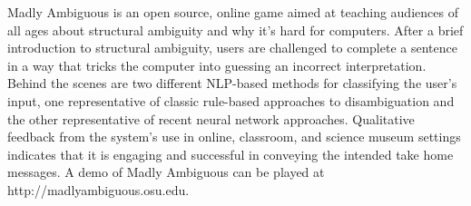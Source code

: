 Madly Ambiguous is an open source, online game aimed at teaching audiences of all ages about structural ambiguity and why it's hard for computers.  After a brief introduction to structural ambiguity, users are challenged to complete a sentence in a way that tricks the computer into guessing an incorrect interpretation.  Behind the scenes are two different NLP-based methods for classifying the user's input, one representative of classic rule-based approaches to disambiguation and the other representative of recent neural network approaches.  Qualitative feedback from the system's use in online, classroom, and science museum settings indicates that it is engaging and successful in conveying the intended take home messages. A demo of Madly Ambiguous can be played at http://madlyambiguous.osu.edu.
